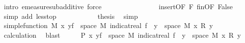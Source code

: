 \begin{isabellebody}
\ {\isacharparenleft}{\kern0pt}intro\ emeasure{\isacharunderscore}{\kern0pt}subadditive{\isacharcomma}{\kern0pt}\ force{\isacharplus}{\kern0pt}{\isacharparenright}{\kern0pt}\isanewline
\ \ \ \ \ \ \ \ \isamarkupfalse%
\ \isamarkupfalse%
\ {\isachardoublequoteopen}{\isachardot}{\kern0pt}{\isachardot}{\kern0pt}{\isachardot}{\kern0pt}\ {\isacharless}{\kern0pt}\ {\isasyminfinity}{\isachardoublequoteclose}\ \isamarkupfalse%
\ insert{\isacharparenleft}{\kern0pt}{}{\isacharparenright}{\kern0pt}{\isacharbrackleft}{\kern0pt}OF\ F{\isacharbrackright}{\kern0pt}\ fin{\isacharunderscore}{\kern0pt}{}{\isacharbrackleft}{\kern0pt}OF\ False{\isacharbrackright}{\kern0pt}\ \isamarkupfalse%
\ {\isacharparenleft}{\kern0pt}simp\ add{\isacharcolon}{\kern0pt}\ less{\isacharunderscore}{\kern0pt}top{\isacharparenright}{\kern0pt}\isanewline
\ \ \ \ \ \ \ \ \isamarkupfalse%
\ \isamarkupfalse%
\ {\isacharquery}{\kern0pt}thesis\ \isamarkupfalse%
\ simp\isanewline
\ \ \ \ \ \ \isamarkupfalse%
\isanewline
\ \ \ \ \isacommand{{\isacharbraceright}{\kern0pt}}\isamarkupfalse%
\isanewline
\ \ \isamarkupfalse%
\isanewline
\ \ \isamarkupfalse%
\ \isamarkupfalse%
\ {\isachardoublequoteopen}simple{\isacharunderscore}{\kern0pt}function\ M\ {\isacharparenleft}{\kern0pt}{\isasymlambda}x{\isachardot}{\kern0pt}\ {\isasymSum}y{\isasymin}f\ {\isacharbackquote}{\kern0pt}\ space\ M{\isachardot}{\kern0pt}\ indicat{\isacharunderscore}{\kern0pt}real\ {\isacharparenleft}{\kern0pt}f\ {\isacharminus}{\kern0pt}{\isacharbackquote}{\kern0pt}\ {\isacharbraceleft}{\kern0pt}y{\isacharbraceright}{\kern0pt}\ {\isasyminter}\ space\ M{\isacharparenright}{\kern0pt}\ x\ {\isacharasterisk}{\kern0pt}\isactrlsub R\ y{\isacharparenright}{\kern0pt}{\isachardoublequoteclose}\ \isamarkupfalse%
\ calculation\ \isamarkupfalse%
\ blast\isanewline
\ \ \isamarkupfalse%
\ \isamarkupfalse%
\ {\isachardoublequoteopen}P\ {\isacharparenleft}{\kern0pt}{\isasymlambda}x{\isachardot}{\kern0pt}\ {\isasymSum}y{\isasymin}f\ {\isacharbackquote}{\kern0pt}\ space\ M{\isachardot}{\kern0pt}\ indicat{\isacharunderscore}{\kern0pt}real\ {\isacharparenleft}{\kern0pt}f\ {\isacharminus}{\kern0pt}{\isacharbackquote}{\kern0pt}\ {\isacharbraceleft}{\kern0pt}y{\isacharbraceright}{\kern0pt}\ {\isasyminter}\ space\ M{\isacharparenright}{\kern0pt}\ x\ {\isacharasterisk}{\kern0pt}\isactrlsub R\ y{\isacharparenright}{\kern0pt}{\isachardoublequoteclose}\ \isamarkupfalse%

\end{isabellebody}
